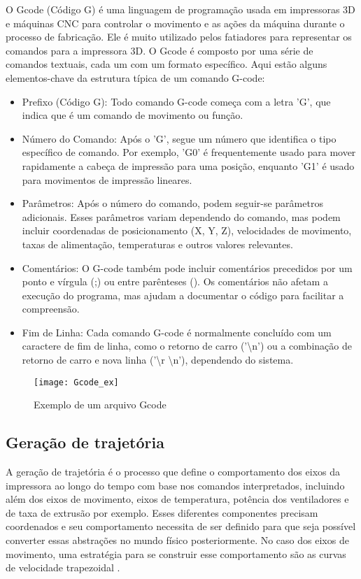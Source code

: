 O Gcode (Código G) é uma linguagem de programação usada em impressoras 3D e máquinas CNC para controlar o movimento e as ações da máquina durante o processo de fabricação. Ele é muito utilizado pelos fatiadores para representar os comandos para a impressora 3D. O Gcode é composto por uma série de comandos textuais, cada um com um formato específico. Aqui estão alguns elementos-chave da estrutura típica de um comando G-code:

\begin{itemize}
    \item Prefixo (Código G): Todo comando G-code começa com a letra 'G', que indica que é um comando de movimento ou função.
    \item Número do Comando: Após o 'G', segue um número que identifica o tipo específico de comando. Por exemplo, 'G0' é frequentemente usado para mover rapidamente a cabeça de impressão para uma posição, enquanto 'G1' é usado para movimentos de impressão lineares.
    \item Parâmetros: Após o número do comando, podem seguir-se parâmetros adicionais. Esses parâmetros variam dependendo do comando, mas podem incluir coordenadas de posicionamento (X, Y, Z), velocidades de movimento, taxas de alimentação, temperaturas e outros valores relevantes.
    \item Comentários: O G-code também pode incluir comentários precedidos por um ponto e vírgula (;) ou entre parênteses (). Os comentários não afetam a execução do programa, mas ajudam a documentar o código para facilitar a compreensão.
    \item Fim de Linha: Cada comando G-code é normalmente concluído com um caractere de fim de linha, como o retorno de carro ('\textbackslash n') ou a combinação de retorno de carro e nova linha ('\textbackslash r \textbackslash n'), dependendo do sistema.
\end{itemize}

\begin{figure}[H]
    \centering
    \caption{Exemplo de um arquivo Gcode}
    \texttt{[image: Gcode\_ex]}
    \label{fig:gcode_ex}
\end{figure}

\subsection{Geração de trajetória}
A geração de trajetória é o processo que define o comportamento dos eixos da impressora ao longo do tempo com base nos comandos interpretados, incluindo além dos eixos de movimento, eixos de temperatura, potência dos ventiladores e de taxa de extrusão por exemplo. Esses diferentes componentes precisam coordenados e seu comportamento necessita de ser definido para que seja possível converter essas abstrações no mundo físico posteriormente. No caso dos eixos de movimento, uma estratégia para se construir esse comportamento são as curvas de velocidade trapezoidal \cite{yu20}. 

